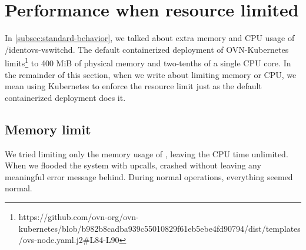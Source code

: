 

\section{Performance when resource limited}

In \cref{subsec:standard-behavior}, we talked about extra memory and CPU usage of /ident{ovs-vswitchd}. The default containerized deployment of OVN-Kubernetes limits\footnote{https://github.com/ovn-org/ovn-kubernetes/blob/b982b8cadba939c55010829f61eb5ebe4fd90794/dist/templates/ovs-node.yaml.j2\#L84-L90}  to 400 MiB of physical memory and two-tenths of a single CPU core. In the remainder of this section, when we write about limiting memory or CPU, we mean using Kubernetes to enforce the resource limit just as the default containerized deployment does it.

\subsection{Memory limit}
We tried limiting only the memory usage of , leaving the CPU time unlimited. When we flooded the system with upcalls,  crashed without leaving any meaningful error message behind. During normal operations, everything seemed normal.

